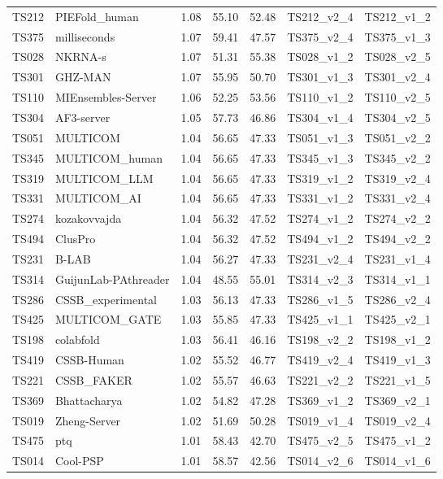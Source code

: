 \begin{longtable}{lllllll}
TS212 & PIEFold\_human & 1.08 & 55.10 & 52.48 & TS212\_v2\_4 & TS212\_v1\_2 \\ 
TS375 & milliseconds & 1.07 & 59.41 & 47.57 & TS375\_v2\_4 & TS375\_v1\_3 \\ 
TS028 & NKRNA-s & 1.07 & 51.31 & 55.38 & TS028\_v1\_2 & TS028\_v2\_5 \\ 
TS301 & GHZ-MAN & 1.07 & 55.95 & 50.70 & TS301\_v1\_3 & TS301\_v2\_4 \\ 
TS110 & MIEnsembles-Server & 1.06 & 52.25 & 53.56 & TS110\_v1\_2 & TS110\_v2\_5 \\ 
TS304 & AF3-server & 1.05 & 57.73 & 46.86 & TS304\_v1\_4 & TS304\_v2\_5 \\ 
TS051 & MULTICOM & 1.04 & 56.65 & 47.33 & TS051\_v1\_3 & TS051\_v2\_2 \\ 
TS345 & MULTICOM\_human & 1.04 & 56.65 & 47.33 & TS345\_v1\_3 & TS345\_v2\_2 \\ 
TS319 & MULTICOM\_LLM & 1.04 & 56.65 & 47.33 & TS319\_v1\_2 & TS319\_v2\_4 \\ 
TS331 & MULTICOM\_AI & 1.04 & 56.65 & 47.33 & TS331\_v1\_2 & TS331\_v2\_4 \\ 
TS274 & kozakovvajda & 1.04 & 56.32 & 47.52 & TS274\_v1\_2 & TS274\_v2\_2 \\ 
TS494 & ClusPro & 1.04 & 56.32 & 47.52 & TS494\_v1\_2 & TS494\_v2\_2 \\ 
TS231 & B-LAB & 1.04 & 56.27 & 47.33 & TS231\_v2\_4 & TS231\_v1\_4 \\ 
TS314 & GuijunLab-PAthreader & 1.04 & 48.55 & 55.01 & TS314\_v2\_3 & TS314\_v1\_1 \\ 
TS286 & CSSB\_experimental & 1.03 & 56.13 & 47.33 & TS286\_v1\_5 & TS286\_v2\_4 \\ 
TS425 & MULTICOM\_GATE & 1.03 & 55.85 & 47.33 & TS425\_v1\_1 & TS425\_v2\_1 \\ 
TS198 & colabfold & 1.03 & 56.41 & 46.16 & TS198\_v2\_2 & TS198\_v1\_2 \\ 
TS419 & CSSB-Human & 1.02 & 55.52 & 46.77 & TS419\_v2\_4 & TS419\_v1\_3 \\ 
TS221 & CSSB\_FAKER & 1.02 & 55.57 & 46.63 & TS221\_v2\_2 & TS221\_v1\_5 \\ 
TS369 & Bhattacharya & 1.02 & 54.82 & 47.28 & TS369\_v1\_2 & TS369\_v2\_1 \\ 
TS019 & Zheng-Server & 1.02 & 51.69 & 50.28 & TS019\_v1\_4 & TS019\_v2\_4 \\ 
TS475 & ptq & 1.01 & 58.43 & 42.70 & TS475\_v2\_5 & TS475\_v1\_2 \\ 
TS014 & Cool-PSP & 1.01 & 58.57 & 42.56 & TS014\_v2\_6 & TS014\_v1\_6 \\ 

\end{longtable}

